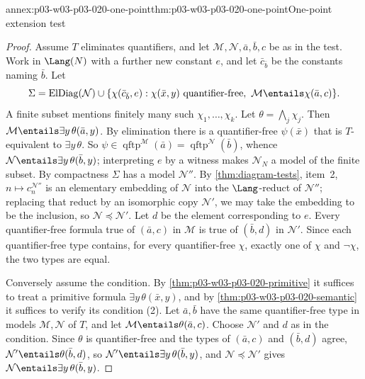 \begin{annexitem}{annex:p03-w03-p03-020-one-point}{thm:p03-w03-p03-020-one-point}{One-point extension test}
\begin{proof}
Assume \(T\) eliminates quantifiers, and let \(\mathcal M,\mathcal N,\bar a,
\bar b,c\) be as in the test. Work in \(\Lang(N)\) with a further new
constant \(e\), and let \(\bar c_{\bar b}\) be the constants naming
\(\bar b\). Let
\[
 \Sigma=\operatorname{ElDiag}(\mathcal N)\cup
 \{\chi(\bar c_{\bar b},e):\chi(\bar x,y)\text{ quantifier-free},\
 \mathcal M\entails\chi(\bar a,c)\}.
\]
A finite subset mentions finitely many such \(\chi_1,\ldots,\chi_k\). Let
\(\theta=\bigwedge_j\chi_j\). Then
\(\mathcal M\entails\exists y\,\theta(\bar a,y)\). By elimination there is a
quantifier-free \(\psi(\bar x)\) that is \(T\)-equivalent to
\(\exists y\,\theta\). So \(\psi\in\operatorname{qftp}^{\mathcal M}(\bar a)=
\operatorname{qftp}^{\mathcal N}(\bar b)\), whence
\(\mathcal N\entails\exists y\,\theta(\bar b,y)\); interpreting \(e\) by a
witness makes \(\mathcal N_N\) a model of the finite subset. By compactness
\(\Sigma\) has a model \(\mathcal N''\). By
\cref{thm:diagram-tests}, item~2, \(n\mapsto c_n^{\mathcal N''}\) is an
elementary embedding of \(\mathcal N\) into the \(\Lang\)-reduct of
\(\mathcal N''\); replacing that reduct by an isomorphic copy
\(\mathcal N'\), we may take the embedding to be the inclusion, so
\(\mathcal N\preccurlyeq\mathcal N'\). Let \(d\) be the element
corresponding to \(e\). Every quantifier-free formula true of
\((\bar a,c)\) in \(\mathcal M\) is true of \((\bar b,d)\) in
\(\mathcal N'\). Since each quantifier-free type contains, for every
quantifier-free \(\chi\), exactly one of \(\chi\) and \(\neg\chi\), the two
types are equal.

Conversely assume the condition. By
\cref{thm:p03-w03-p03-020-primitive} it suffices to treat a primitive
formula \(\exists y\,\theta(\bar x,y)\), and by
\cref{thm:p03-w03-p03-020-semantic} it suffices to verify its condition
(2). Let \(\bar a,\bar b\) have the same quantifier-free type in models
\(\mathcal M,\mathcal N\) of \(T\), and let
\(\mathcal M\entails\theta(\bar a,c)\). Choose \(\mathcal N'\) and \(d\) as
in the condition. Since \(\theta\) is quantifier-free and the types of
\((\bar a,c)\) and \((\bar b,d)\) agree,
\(\mathcal N'\entails\theta(\bar b,d)\), so
\(\mathcal N'\entails\exists y\,\theta(\bar b,y)\), and
\(\mathcal N\preccurlyeq\mathcal N'\) gives
\(\mathcal N\entails\exists y\,\theta(\bar b,y)\).
\end{proof}
\end{annexitem}

